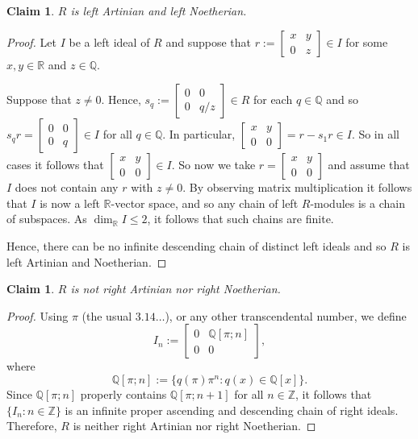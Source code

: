 \documentclass[12pt]{article}
\newtheorem{claim}[thm]{Claim}
\begin{document}
\begin{claim}
 $R$ is left Artinian and left Noetherian.  
\end{claim}
\begin{proof}
Let $I$ be a left ideal of $R$ and suppose
that $r:=\begin{bmatrix} x & y \\ 0 & z\end{bmatrix}\in I$ for some
$x,y\in\mathbb{R}$ and $z\in\mathbb{Q}$.

Suppose that $z\neq 0$.  Hence, $s_q:=\begin{bmatrix} 0 & 0 \\ 0 & q/z\end{bmatrix}\in R$
for each $q\in\mathbb{Q}$ 
and so $s_qr=\begin{bmatrix} 0 & 0 \\ 0 & q\end{bmatrix}\in I$ for all $q\in\mathbb{Q}$.  In particular,
$\begin{bmatrix} x & y \\ 0 & 0 \end{bmatrix}=r-s_{1}r\in I$.  So in all cases it follows that 
$\begin{bmatrix} x & y\\ 0 & 0 \end{bmatrix} \in I$.  So now we take 
$r=\begin{bmatrix} x & y \\ 0 & 0 \end{bmatrix}$ and assume that $I$ does not contain any $r$ with $z\neq 0$.  
By observing matrix multiplication it follows that $I$ is now a left $\mathbb{R}$-vector space, and so any
chain of left $R$-modules is a chain of subspaces.  As $\dim_{\mathbb{R}} I\leq 2$,
it follows that such chains are finite.

Hence, there can be no infinite descending chain of distinct left ideals
and so $R$ is left Artinian and Noetherian.
\end{proof}

\begin{claim}
$R$ is not right Artinian nor right Noetherian.
\end{claim}
\begin{proof}
Using $\pi$ (the usual $3.14\dots$), or any other transcendental number, we define
\begin{equation}
   I_n := \begin{bmatrix} 0 & \mathbb{Q}[\pi;n] \\ 0 & 0 \end{bmatrix},
\end{equation}
where 
\begin{equation}
   \mathbb{Q}[\pi;n] := \{ q(\pi)\pi^{n} : q(x)\in\mathbb{Q}[x]\}.
\end{equation}
Since $\mathbb{Q}[\pi;n]$ properly contains $\mathbb{Q}[\pi;n+1]$ for all
$n\in\mathbb{Z}$, it follows that $\{I_n:n\in\mathbb{Z}\}$ is an infinite proper 
ascending and descending chain of right ideals.  Therefore, $R$ is neither right Artinian
nor right Noetherian.
\end{proof}
\end{document}
